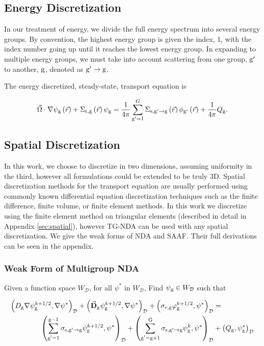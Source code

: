 \subsection{Energy Discretization}
In our treatment of energy, we divide the full energy spectrum into several energy groups. By convention, the highest energy group is given the index, 1, with the index number going up until it reaches the lowest energy group. In expanding to multiple energy groups, we must take into account scattering from one group, $\mathrm{g}'$ to another, $\mathrm{g}$, denoted as $\mathrm{g}' \rightarrow \mathrm{g} $. 

The energy discretized, steady-state, transport equation is

 \begin{equation}
  \vec{\Omega} \cdot \nabla \psi_{\mathrm{g}} \left(\vec{r}\right)+ \Sigma_{\mathrm{t}, \mathrm{g}}\left(\vec{r}\right)\psi_{\mathrm{g}} = \frac{1}{4 \pi} \sum\limits_{\mathrm{g}'=1}^{G}\Sigma_{\mathrm{s}, \mathrm{g}' \rightarrow \mathrm{g}}\left(\vec{r}\right) \phi_{\mathrm{g}'}\left(\vec{r}\right) + \frac{1}{4 \pi} Q_{\mathrm{g}}.
  \label{eq:transport-energy}
 \end{equation}


\subsection{Spatial Discretization}
In this work, we choose to discretize in two dimensions, assuming uniformity in the third, however all formulations could be extended to be truly 3D. Spatial discretization methods for the transport equation are usually performed using commonly known differential equation discretization techniques such as the finite difference, finite volume, or finite element methods. In this work we discretize using the finite element method on triangular elements (described in detail in Appendix \ref{sec:spatial}), however TG-NDA can be used with any spatial discretization. We give the weak forms of NDA and SAAF. Their full derivations can be seen in the appendix. 



\subsubsection{Weak Form of Multigroup NDA}

Given a function space $W_\mathcal{D}$, for all $\psi^*$ in $W_\mathcal{D}$, Find $\psi_{\mathrm{g}} \in W_\mathcal{D}$ such that

\begin{equation}
 \begin{split}
  \left(D_{\mathrm{g}} \nabla \psi_{\mathrm{g}}^{k+1/2}, \nabla \psi^*\right)_\mathcal{D} + \left(\vec{\bf{D}}_{\mathrm{g}} \psi_{\mathrm{g}}^{k+1/2} , \nabla \psi^*\right)_\mathcal{D} +  \left(\sigma_{r,\mathrm{g}} \varphi_{\mathrm{g}}^{k+1/2}, \psi^*\right)_\mathcal{D} &=  \\
   \left(\sum\limits_{\substack{\mathrm{g}'=1}}^{\mathrm{g-1}} \sigma_{\mathrm{s},\mathrm{g}' \to\mathrm{g}}\psi_{\mathrm{g}}^{k+1/2}, \psi^*\right)_\mathcal{D} + \left(\sum\limits_{\substack{\mathrm{g}'=\mathrm{g}+1}}^{\mathrm{G}} \sigma_{\mathrm{s},\mathrm{g}' \to\mathrm{g}}\psi_{\mathrm{g}}^{k}, \psi^*\right)_\mathcal{D} 
  &+ \left(Q_{\mathrm{g}}, \psi^*_{\mathrm{g}}\right)_\mathcal{D} 
 \end{split}
 \label{k1/2}
\end{equation}


